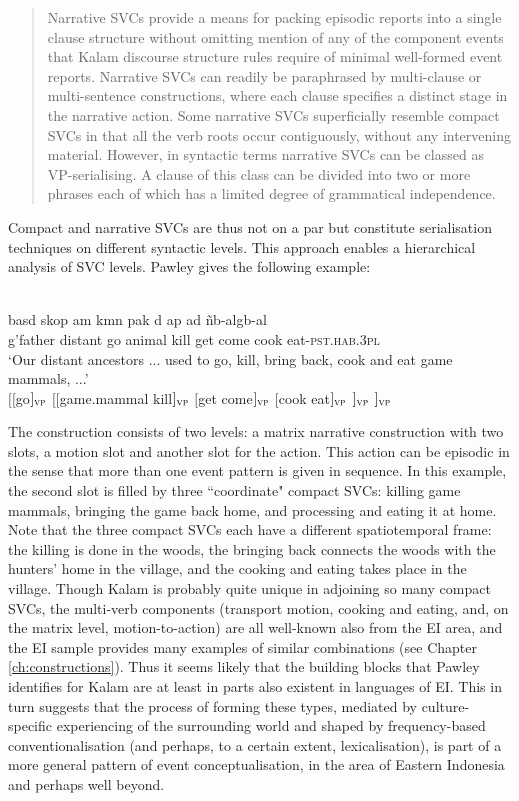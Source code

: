 \begin{quote}Narrative SVCs provide a means for packing episodic reports into a single clause structure without omitting mention of any of the component events that Kalam discourse structure rules require of minimal well-formed event reports. Narrative SVCs can readily be paraphrased by multi-clause or multi-sentence constructions, where each clause specifies a distinct stage in the narrative action. Some narrative SVCs superficially resemble compact SVCs in that all the verb roots occur contiguously, without any intervening material. However, in syntactic terms narrative SVCs can be classed as VP-serialising. A clause of this class can be divided into two or more phrases each of which has a limited degree of grammatical independence. \citep[174]{pawley2008serial}\end{quote}

Compact and narrative SVCs are thus not on a par but constitute serialisation techniques on different syntactic levels. This approach enables a hierarchical analysis of SVC levels. Pawley gives the following example:

\ea 
{}\\
\ea
\gll basd skop am kmn pak d ap ad ñb-algb-al \\
g'father distant go animal kill get come cook eat-\textsc{pst}.\textsc{hab}.\textsc{3}\textsc{pl} \\
\glft `Our distant ancestors ... used to go, kill, bring back, cook and eat game mammals, ...'\\ 
\ex
$[[$go$]_{\textsc{vp}}$ $[[$game.mammal kill$]_{\textsc{vp}}$ $[$get come$]_{\textsc{vp}}$ $[$cook eat$]_{\textsc{vp}}$ $]_{\textsc{vp}}$ $]_{\textsc{vp}}$\\
\z
\z

The construction consists of two levels: a matrix narrative construction with two slots, a motion slot and another slot for the action. This action can be episodic in the sense that more than one event pattern is given in sequence. In this example, the second slot is filled by three ``coordinate" compact SVCs: killing game mammals, bringing the game back home, and processing and eating it at home. Note that the three compact SVCs each have a different spatiotemporal frame: the killing is done in the woods, the bringing back connects the woods with the hunters' home in the village, and the cooking and eating takes place in the village. Though Kalam is probably quite unique in adjoining so many compact SVCs, the multi-verb components (transport motion, cooking and eating, and, on the matrix level, motion-to-action) are all well-known also from the EI area, and the EI sample provides many examples of similar combinations (see Chapter \ref{ch:constructions}). Thus it seems likely that the building blocks that Pawley identifies for Kalam are at least in parts also existent in languages of EI. This in turn suggests that the process of forming these types, mediated by culture-specific experiencing of the surrounding world and shaped by frequency-based conventionalisation (and perhaps, to a certain extent, lexicalisation), is part of a more general pattern of event conceptualisation, in the area of Eastern Indonesia and perhaps well beyond.

